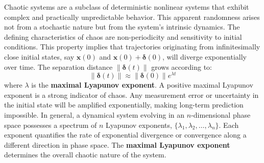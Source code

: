 \documentclass[a4paper,12pt]{article}
\begin{document}
    Chaotic systems are a subclass of deterministic nonlinear systems that exhibit complex and practically unpredictable behavior. This apparent randomness arises not from a stochastic nature but from the system's intrinsic dynamics. The defining characteristics of chaos are non-periodicity and sensitivity to initial conditions. This property implies that trajectories originating from infinitesimally close initial states, say $\mathbf{x}(0)$ and $\mathbf{x}(0) + \bm{\delta}(0)$, will diverge exponentially over time. The separation distance $\|\bm{\delta}(t)\|$ grows according to:
    \begin{equation}
        \|\bm{\delta}(t)\| \approx \|\bm{\delta}(0)\| e^{\lambda t}
    \end{equation}
    where $\lambda$ is the \textbf{maximal Lyapunov exponent}. A positive maximal Lyapunov exponent is a strong indicator of chaos. Any measurement error or uncertainty in the initial state will be amplified exponentially, making long-term prediction impossible. 
    In general, a dynamical system evolving in an $n$-dimensional phase space possesses a spectrum of $n$ Lyapunov exponents, $\{\lambda_1, \lambda_2, \ldots, \lambda_n\}$. Each exponent quantifies the rate of exponential divergence or convergence along a different direction in phase space. The \textbf{maximal Lyapunov exponent} determines the overall chaotic nature of the system.
\end{document}
